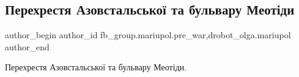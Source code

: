  
 
 
 
 

\subsection{Перехрестя Азовстальської та бульвару Меотіди}
\label{sec:29_01_2023.fb.fb_group.mariupol.pre_war.2.perekhrestya_azovsta}
 
\ifcmt
 author_begin
   author_id fb_group.mariupol.pre_war,drobot_olga.mariupol
 author_end
\fi

Перехрестя Азовстальської та бульвару Меотіди.
